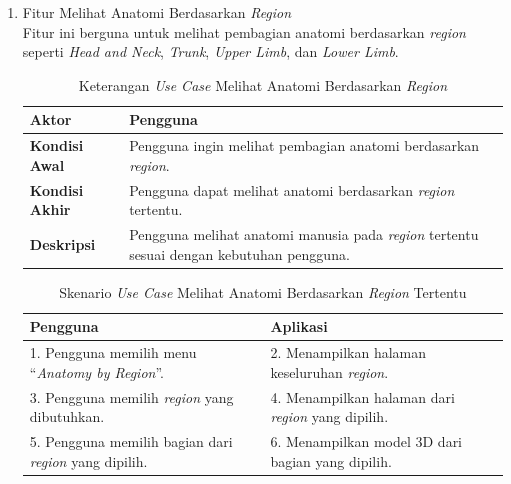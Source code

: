     
\begin{enumerate}
    \item Fitur Melihat Anatomi Berdasarkan \textit{Region} \\
    Fitur ini berguna untuk melihat pembagian anatomi berdasarkan \textit{region} seperti \textit{Head and Neck}, \textit{Trunk}, \textit{Upper Limb}, dan \textit{Lower Limb}.
    
    \begin{table}[H]
        \centering
        \caption{Keterangan \textit{Use Case} Melihat Anatomi Berdasarkan \textit{Region}}
        \label{tab:keterangan_usecase_region}
        \begin{tabular}{|l|p{10cm}|}
            \hline
            \textbf{Aktor} & Pengguna \\ \hline
            \textbf{Kondisi Awal} & Pengguna ingin melihat pembagian anatomi berdasarkan \textit{region}. \\ \hline
            \textbf{Kondisi Akhir} & Pengguna dapat melihat anatomi berdasarkan \textit{region} tertentu. \\ \hline
            \textbf{Deskripsi} & Pengguna melihat anatomi manusia pada \textit{region} tertentu sesuai dengan kebutuhan pengguna. \\ \hline
        \end{tabular}
    \end{table}

    \begin{table}[H]
        \centering
        \caption{Skenario \textit{Use Case} Melihat Anatomi Berdasarkan \textit{Region} Tertentu}
        \label{tab:skenario_usecase_region}
        \begin{tabular}{|p{7cm}|p{7cm}|}
            \hline
            \textbf{Pengguna} & \textbf{Aplikasi} \\ \hline
            1. Pengguna memilih menu ``\textit{Anatomy by Region}''. 
            & 2. Menampilkan halaman keseluruhan \textit{region}. \\ \hline
            3. Pengguna memilih \textit{region} yang dibutuhkan.
            & 4. Menampilkan halaman dari \textit{region} yang dipilih. \\ \hline
            5. Pengguna memilih bagian dari \textit{region} yang dipilih.
            & 6. Menampilkan model 3D dari bagian yang dipilih. \\ \hline
        \end{tabular}
    \end{table}



\end{enumerate}
